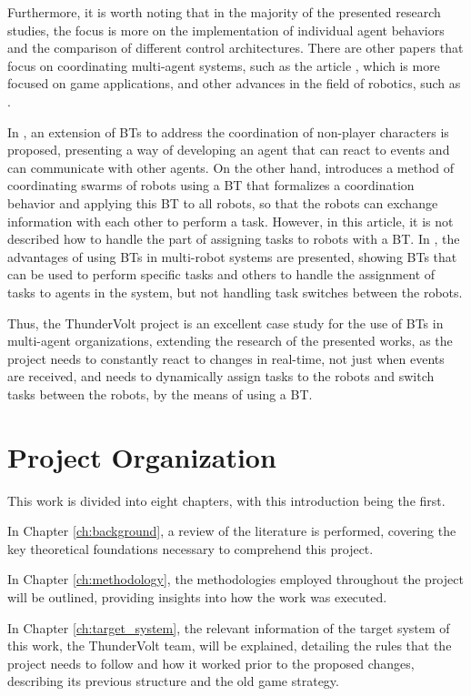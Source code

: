 Furthermore, it is worth noting that in the majority of the presented research studies, the focus is more on the implementation of individual agent behaviors and the comparison of different control architectures. There are other papers that focus on coordinating multi-agent systems, such as the article \cite{Event-DrivenBTs}, which is more focused on game applications, and other advances in the field of robotics, such as \cite{Self-ReactivePlanningOfMulti-Robots, BTsMultRobot}. 

In \cite{Event-DrivenBTs}, an extension of BTs to address the coordination of non-player characters is proposed, presenting a way of developing an agent that can react to events and can communicate with other agents. On the other hand, \cite{Self-ReactivePlanningOfMulti-Robots} introduces a method of coordinating swarms of robots using a BT that formalizes a coordination behavior and applying this BT to all robots, so that the robots can exchange information with each other to perform a task. However, in this article, it is not described how to handle the part of assigning tasks to robots with a BT. In \cite{BTsMultRobot}, the advantages of using BTs in multi-robot systems are presented, showing BTs that can be used to perform specific tasks and others to handle the assignment of tasks to agents in the system, but not handling task switches between the robots. 

Thus, the ThunderVolt project is an excellent case study for the use of BTs in multi-agent organizations, extending the research of the presented works, as the project needs to constantly react to changes in real-time, not just when events are received, and needs to dynamically assign tasks to the robots and switch tasks between the robots, by the means of using a BT.

\section{Project Organization}

This work is divided into eight chapters, with this introduction being the first.

In Chapter \ref{ch:background}, a review of the literature is performed, covering the key theoretical foundations necessary to comprehend this project.

In Chapter \ref{ch:methodology}, the methodologies employed throughout the project will be outlined, providing insights into how the work was executed.

In Chapter \ref{ch:target_system}, the relevant information of the target system of this work, the ThunderVolt team, will be explained, detailing the rules that the project needs to follow and how it worked prior to the proposed changes, describing its previous structure and the old game strategy.

